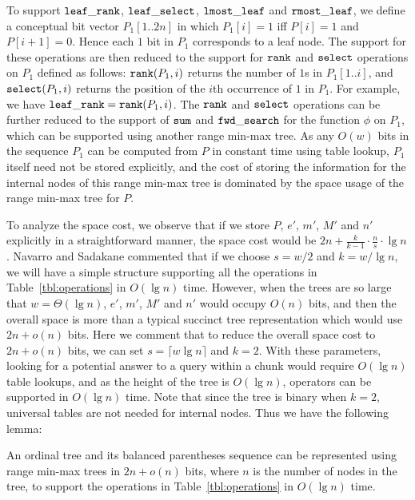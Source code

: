 To support $\mathtt{leaf\_rank}$, $\mathtt{leaf\_select}$, $\mathtt{lmost\_leaf}$ and \linebreak $\mathtt{rmost\_leaf}$, we define a conceptual bit vector $P_1[1..2n]$ in which $P_1[i] = 1$ iff $P[i] = 1$ and $P[i+1] = 0$. 
Hence each $1$ bit in $P_1$ corresponds to a leaf node. 
The support for these operations are then reduced to the support for $\mathtt{rank}$ and $\mathtt{select}$ operations on $P_1$ defined as follows: $\mathtt{rank}(P_1, i)$ returns the number of $1$s in $P_1[1..i]$, and $\mathtt{select}(P_1, i)$ returns the position of the $i$th occurrence of $1$ in $P_1$. 
For example, we have $\mathtt{leaf\_rank} = \mathtt{rank}(P_1, i)$. 
The $\mathtt{rank}$ and $\mathtt{select}$ operations can be further reduced to the support of $\mathtt{sum}$ and $\mathtt{fwd\_search}$ for the function $\phi$ on $P_1$, which can be supported using another range min-max tree. 
As any $O(w)$ bits in the sequence $P_1$ can be computed from $P$ in constant time using table lookup, $P_1$ itself need not be stored explicitly, and the cost of storing the information for the internal nodes of this range min-max tree is dominated by the space usage of the range min-max tree for $P$. 

To analyze the space cost, we observe that if we store $P$, $e'$, $m'$, $M'$ and $n'$ explicitly in a straightforward manner, the space cost would be $2n + \frac{k}{k-1} \cdot \frac{n}{s} \cdot \lg n$. 
Navarro and Sadakane commented that if we choose $s = w/2$ and $k = w / \lg n$, we will have a simple structure supporting all the operations in Table~\ref{tbl:operations} in $O(\lg n)$ time. 
However, when the trees are so large that $w = \Theta(\lg n)$, $e'$, $m'$, $M'$ and $n'$ would occupy $O(n)$ bits, and then the overall space is more than a typical succinct tree representation which would use $2n+o(n)$ bits. 
Here we comment that to reduce the overall space cost to $2n+o(n)$ bits, we can set $s = \lceil w\lg n\rceil$ and $k = 2$. With these parameters, looking for a potential answer to a query within a chunk would require $O(\lg n)$ table lookups, and as the height of the tree is $O(\lg n)$, operators can be supported in $O(\lg n)$ time. Note that since the tree is binary when $k = 2$, universal tables are not needed for internal nodes. Thus we have the following lemma:

\begin{lemma}\label{lem:lg}
An ordinal tree and its balanced parentheses sequence can be represented using range min-max trees in $2n + o(n)$ bits, where $n$ is the number of nodes in the tree, to support the operations in Table~\ref{tbl:operations} in $O(\lg n)$ time. 
\end{lemma}

